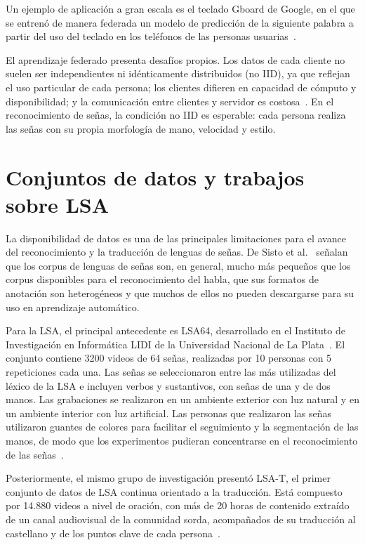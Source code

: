 Un ejemplo de aplicación a gran escala es el teclado Gboard de Google, en el que se entrenó de manera federada un modelo de predicción de la siguiente palabra a partir del uso del teclado en los teléfonos de las personas usuarias~\cite{hard2018gboard}.

El aprendizaje federado presenta desafíos propios. Los datos de cada cliente no suelen ser independientes ni idénticamente distribuidos (no IID), ya que reflejan el uso particular de cada persona; los clientes difieren en capacidad de cómputo y disponibilidad; y la comunicación entre clientes y servidor es costosa~\cite{kairouz2021advances}. En el reconocimiento de señas, la condición no IID es esperable: cada persona realiza las señas con su propia morfología de mano, velocidad y estilo.

\section{Conjuntos de datos y trabajos sobre LSA}
\label{sec:datos-lsa}

La disponibilidad de datos es una de las principales limitaciones para el avance del reconocimiento y la traducción de lenguas de señas. De Sisto et al.~\cite{desisto2022challenges} señalan que los corpus de lenguas de señas son, en general, mucho más pequeños que los corpus disponibles para el reconocimiento del habla, que sus formatos de anotación son heterogéneos y que muchos de ellos no pueden descargarse para su uso en aprendizaje automático.

Para la LSA, el principal antecedente es LSA64, desarrollado en el Instituto de Investigación en Informática LIDI de la Universidad Nacional de La Plata~\cite{ronchetti2016lsa64}. El conjunto contiene 3200 videos de 64 señas, realizadas por 10 personas con 5 repeticiones cada una. Las señas se seleccionaron entre las más utilizadas del léxico de la LSA e incluyen verbos y sustantivos, con señas de una y de dos manos. Las grabaciones se realizaron en un ambiente exterior con luz natural y en un ambiente interior con luz artificial. Las personas que realizaron las señas utilizaron guantes de colores para facilitar el seguimiento y la segmentación de las manos, de modo que los experimentos pudieran concentrarse en el reconocimiento de las señas~\cite{ronchetti2016lsa64}.

Posteriormente, el mismo grupo de investigación presentó LSA-T, el primer conjunto de datos de LSA continua orientado a la traducción. Está compuesto por 14.880 videos a nivel de oración, con más de 20 horas de contenido extraído de un canal audiovisual de la comunidad sorda, acompañados de su traducción al castellano y de los puntos clave de cada persona~\cite{dalbianco2022lsat}.

